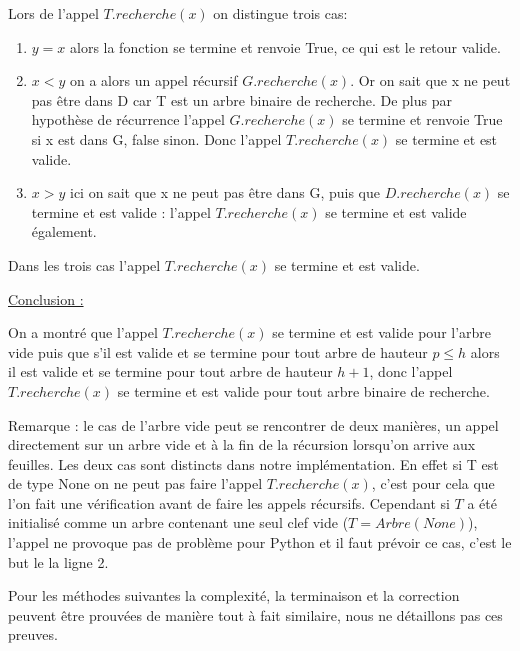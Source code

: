 \documentclass{report}
\begin{document}
\begin{itemize}
    Lors de l'appel $T.recherche(x)$ on distingue trois cas:
    \begin{enumerate}
    \item $y = x$ alors la fonction se termine et renvoie True, ce qui est le retour valide.
    \item $ x < y$ on a alors un appel récursif $G.recherche(x)$. Or on sait que x ne peut pas être dans D car T est un arbre binaire de recherche. De plus par hypothèse de récurrence l'appel $G.recherche(x)$ se termine et renvoie True si x est dans G, false sinon. Donc l'appel $T.recherche(x)$ se termine et est valide.
    \item $x > y$ ici on sait que x ne peut pas être dans G, puis que $D.recherche(x)$ se termine et est valide : l'appel $T.recherche(x)$ se termine et est valide également.
    \end{enumerate}
    Dans les trois cas l'appel $T.recherche(x)$ se termine et est valide.
\begin{flushleft}
    \underline{Conclusion :}
    \end{flushleft}

On a montré que l'appel $T.recherche(x)$ se termine et est valide pour l'arbre vide puis que s'il est valide et se termine pour tout arbre de hauteur $p \leq h$ alors il est valide et se termine pour tout arbre de hauteur $h+1$, donc l'appel $T.recherche(x)$ se termine et est valide pour tout arbre binaire de recherche.
\end{itemize}

Remarque : le cas de l'arbre vide peut se rencontrer de deux manières, un appel directement sur un arbre vide et à la fin de la récursion lorsqu'on arrive aux feuilles. Les deux cas sont distincts dans notre implémentation. En effet si T est de type None on ne peut pas faire l'appel $T.recherche(x)$, c'est pour cela que l'on fait une vérification avant de faire les appels récursifs. Cependant si $T$ a été initialisé comme un arbre contenant une seul clef vide ($T = Arbre(None)$), l'appel ne provoque pas de problème pour Python et il faut prévoir ce cas, c'est le but le la ligne 2. 

Pour les méthodes suivantes la complexité, la terminaison et la correction peuvent être prouvées de manière tout à fait similaire, nous ne détaillons pas ces preuves. 
\end{document}
